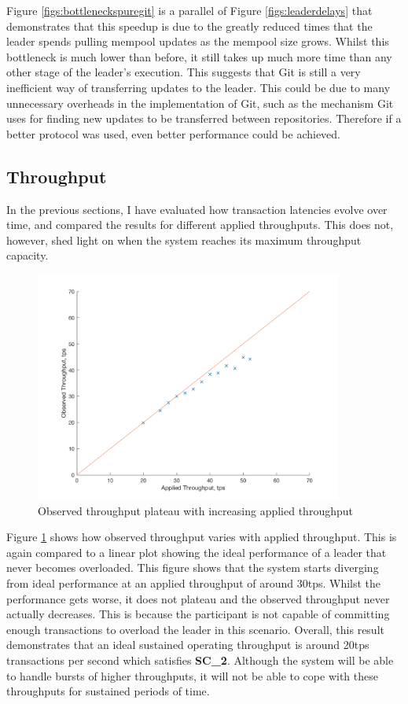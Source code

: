 \documentclass[12pt,a4paper,twoside,openright]{report}
\begin{document}
	Figure \ref{figs:bottleneckspuregit} is a parallel of Figure \ref{figs:leaderdelays} that demonstrates that this speedup is due to the greatly reduced times that the leader spends pulling mempool updates as the mempool size grows.
	Whilst this bottleneck is much lower than before, it still takes up much more time than any other stage of the leader's execution.
	This suggests that Git is still a very inefficient way of transferring updates to the leader.  
	This could be due to many unnecessary overheads in the implementation of Git, such as the mechanism Git uses for finding new updates to be transferred between repositories. 
	Therefore if a better protocol was used, even better performance could be achieved.\\

	\subsection{Throughput}
	In the previous sections, I have evaluated how transaction latencies evolve over time, and compared the results for different applied throughputs.
	This does not, however, shed light on when the system reaches its maximum throughput capacity.
	\begin{figure}
		\includegraphics[width=0.9\textwidth] {figs/appliedvsobservedsingle.png}
		\caption{Observed throughput plateau with increasing applied throughput}
		\label{figs:appliedobservedsingle}
	\end{figure}
	Figure \ref{figs:appliedobservedsingle} shows how observed throughput varies with applied throughput. 
	This is again compared to a linear plot showing the ideal performance of a leader that never becomes overloaded.
	This figure shows that the system starts diverging from ideal performance at an applied throughput of around 30tps.
	Whilst the performance gets worse, it does not plateau and the observed throughput never actually decreases.
	This is because the participant is not capable of committing enough transactions to overload the leader in this scenario.
	Overall, this result demonstrates that an ideal sustained operating throughput is around 20tps transactions per second which satisfies \textbf{SC\_2}.
	Although the system will be able to handle bursts of higher throughputs, it will not be able to cope with these throughputs for sustained periods of time.
\end{document}

